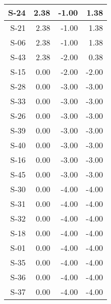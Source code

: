 \begin{tabular}{ | r | r | r | r | }
    \hline
                  S-24  &            2.38  &           -1.00  &            1.38  \\
    \hline
                  S-21  &            2.38  &           -1.00  &            1.38  \\
    \hline
                  S-06  &            2.38  &           -1.00  &            1.38  \\
    \hline
                  S-43  &            2.38  &           -2.00  &            0.38  \\
    \hline
                  S-15  &            0.00  &           -2.00  &           -2.00  \\
    \hline
                  S-28  &            0.00  &           -3.00  &           -3.00  \\
    \hline
                  S-33  &            0.00  &           -3.00  &           -3.00  \\
    \hline
                  S-26  &            0.00  &           -3.00  &           -3.00  \\
    \hline
                  S-39  &            0.00  &           -3.00  &           -3.00  \\
    \hline
                  S-40  &            0.00  &           -3.00  &           -3.00  \\
    \hline
                  S-16  &            0.00  &           -3.00  &           -3.00  \\
    \hline
                  S-45  &            0.00  &           -3.00  &           -3.00  \\
    \hline
                  S-30  &            0.00  &           -4.00  &           -4.00  \\
    \hline
                  S-31  &            0.00  &           -4.00  &           -4.00  \\
    \hline
                  S-32  &            0.00  &           -4.00  &           -4.00  \\
    \hline
                  S-18  &            0.00  &           -4.00  &           -4.00  \\
    \hline
                  S-01  &            0.00  &           -4.00  &           -4.00  \\
    \hline
                  S-35  &            0.00  &           -4.00  &           -4.00  \\
    \hline
                  S-36  &            0.00  &           -4.00  &           -4.00  \\
    \hline
                  S-37  &            0.00  &           -4.00  &           -4.00  \\

\end{tabular}
